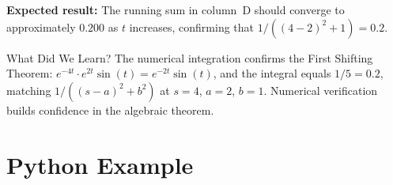 \documentclass[12pt,a4paper]{article}
\begin{document}
\textbf{Expected result:} The running sum in column~D should converge to approximately $0.200$
as $t$ increases, confirming that $1/((4-2)^2+1) = 0.2$.

\begin{learnbox}{What Did We Learn?}
The numerical integration confirms the First Shifting Theorem: $e^{-4t}\cdot e^{2t}\sin(t)
= e^{-2t}\sin(t)$, and the integral equals $1/5 = 0.2$, matching $1/((s-a)^2+b^2)$ at
$s=4$, $a=2$, $b=1$. Numerical verification builds confidence in the algebraic theorem.
\end{learnbox}

\section{Python Example }
\end{document}
